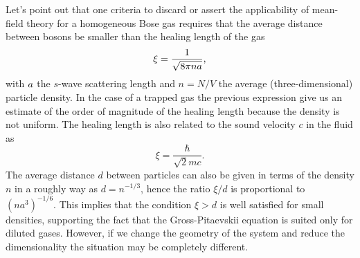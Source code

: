 Let's point out that one criteria to discard or assert the applicability of mean-field theory for a homogeneous Bose gas requires that the average distance between bosons be smaller than the healing length of the gas
%
\begin{equation}
	\label{eq:healing-length}
    \xi = \frac{1}{\sqrt{8 \pi n a}},
\end{equation}
%
with $a$ the $s$-wave scattering length and $n = N/V$ the average (three-dimensional) particle density. In the case
of a trapped gas the previous expression give us an estimate of the order of magnitude of the healing length because
the density is not uniform. The healing length is also related to the sound velocity $c$ in the fluid as
%
\begin{equation}
	\label{eq:healing-length-sound-velocity}
	\xi = \frac{\hbar}{\sqrt{2} m c}.
\end{equation}
 The average
distance $d$ between particles can also be given in terms of the density $n$ in a roughly way as $d = n^{-1/3}$,
hence the ratio $\xi / d$ is proportional to $(na^3)^{-1/6}$. This implies that the condition $\xi > d$ is well
satisfied for small densities, supporting the fact that the Gross-Pitaevskii equation is suited only for diluted gases.
However, if we change the geometry of the system and reduce the dimensionality the situation may be completely different.

